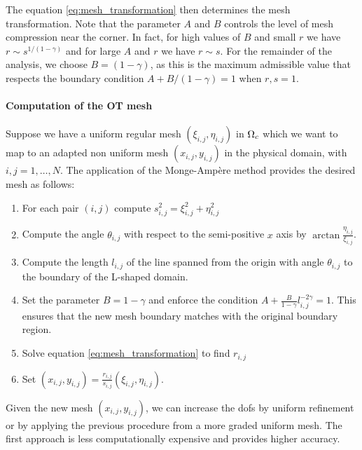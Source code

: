 \documentclass[a4paper,11pt]{article}
\begin{document}
The equation \eqref{eq:mesh_transformation} then determines the mesh transformation. Note that the parameter $A$ and $B$ controls the level of mesh compression near the corner. In fact, for high values of $B$ and small $r$ we have $r \sim s^{1/(1-\gamma)}$ and for large $A$ and $r$ we have $r \sim s$. For the remainder of the analysis, we choose $B = (1-\gamma)$, as this is the maximum admissible value that respects the boundary condition $A + B/(1-\gamma) = 1$ when $r,s = 1$. 


\paragraph{Computation of the OT mesh}

Suppose we have a uniform regular mesh $(\xi_{i,j},\eta_{i,j})$ in $\Omega_{c}$ which we want to map to an adapted non uniform mesh $(x_{i,j},y_{i,j})$ in the physical domain, with $i,j = 1,\dots,N$. The application of the Monge-Ampère method provides the desired mesh as follows:

\begin{enumerate}
    \item For each pair $(i,j)$ compute $s_{i,j}^{2} = \xi_{i,j}^{2} + \eta_{i,j}^{2}$
    \item Compute the angle $\theta_{i,j}$ with respect to the semi-positive $x$ axis by $\arctan{\frac{\eta_{i,j}}{\xi_{i,j}}}$. 
    \item Compute the length $l_{i,j}$ of the line spanned from the origin with angle $\theta_{i,j}$ to the boundary of the L-shaped domain.
    \item Set the parameter $B = 1 - \gamma$ and enforce the condition $A + \frac{B}{1-\gamma}l_{i,j}^{-2\gamma} = 1$. This ensures that the new mesh boundary matches with the original boundary region.
      
    \item Solve equation \eqref{eq:mesh_transformation} to find $r_{i,j}$
    \item Set $(x_{i,j},y_{i,j}) = \frac{r_{i,j}}{s_{i,j}}(\xi_{i,j},\eta_{i,j})$.
\end{enumerate}


Given the new mesh $(x_{i,j},y_{i,j})$, we can increase the dofs by uniform refinement or by applying the previous procedure from a more graded uniform mesh. The first approach is less computationally expensive and provides higher accuracy.
\end{document}
